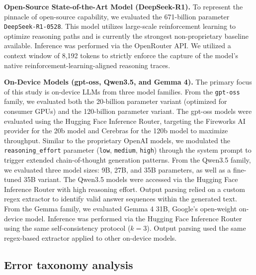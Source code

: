 \documentclass[10pt,journal,compsoc, onecolumn]{IEEEtran}
\begin{document}
\textbf{Open-Source State-of-the-Art Model (DeepSeek-R1).}
To represent the pinnacle of open-source capability, we evaluated the 671-billion parameter \texttt{DeepSeek-R1-0528}. This model utilizes large-scale reinforcement learning to optimize reasoning paths and is currently the strongest non-proprietary baseline available. Inference was performed via the OpenRouter API. We utilized a context window of 8{,}192 tokens to strictly enforce the capture of the model's native reinforcement-learning-aligned reasoning traces. 

\textbf{On-Device Models (gpt-oss, Qwen3.5, and Gemma 4).}
The primary focus of this study is on-device LLMs from three model families. From the \texttt{gpt-oss} family, we evaluated both the 20-billion parameter variant (optimized for consumer GPUs) and the 120-billion parameter variant. The gpt-oss models were evaluated using the Hugging Face Inference Router, targeting the Fireworks AI provider for the 20b model and Cerebras for the 120b model to maximize throughput. Similar to the proprietary OpenAI models, we modulated the \texttt{reasoning\_effort} parameter (\texttt{low}, \texttt{medium}, \texttt{high}) through the system prompt to trigger extended chain-of-thought generation patterns. From the Qwen3.5 family, we evaluated three model sizes: 9B, 27B, and 35B parameters, as well as a fine-tuned 35B variant. The Qwen3.5 models were accessed via the Hugging Face Inference Router with high reasoning effort. Output parsing relied on a custom regex extractor to identify valid answer sequences within the generated text.
From the Gemma family, we evaluated Gemma 4 31B, Google's open-weight on-device model. Inference was performed via the Hugging Face Inference Router using the same self-consistency protocol ($k=3$). Output parsing used the same regex-based extractor applied to other on-device models.

\subsection*{Error taxonomy analysis}
\end{document}
